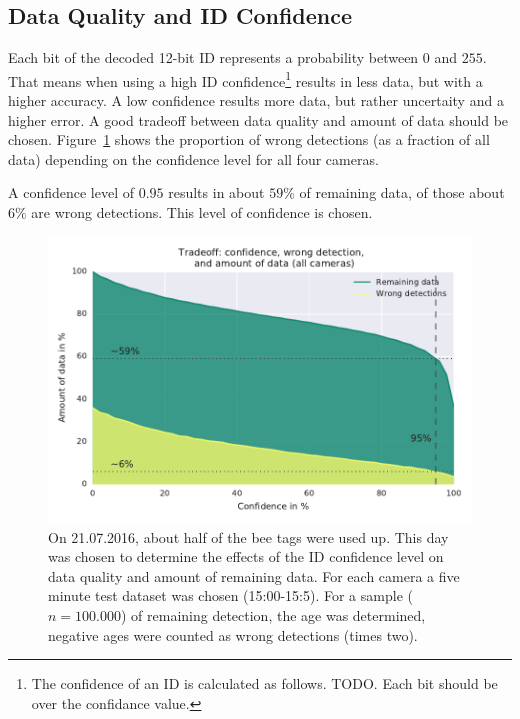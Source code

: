 \subsection{Data Quality and ID Confidence}
\label{subsec:confidence}

Each bit of the decoded 12-bit ID represents a probability between $0$ and $255$. That means when using a high ID confidence\footnote{The confidence of an ID is calculated as follows. TODO. Each bit should be over the confidance value.} results in less data, but with a higher accuracy.
A low confidence results more data, but rather uncertaity and a higher error. A good tradeoff between data quality and amount of data should be chosen. Figure~\ref{fig:tradeoff} shows the proportion of wrong detections (as a fraction of all data) depending on the confidence level for all four cameras.

A confidence level of $0.95$ results in about $59\%$ of remaining data, of those about $6\%$ are wrong detections. This level of confidence is chosen.

\begin{figure}[htb]
	\centering
	\includegraphics[width=1.0\textwidth]{Figures/tradeoff}
	\caption[Tradeoff: Confidence level, data quality and amount of data]{On 21.07.2016, about half of the bee tags were used up. This day was chosen to determine the effects of the ID confidence level on data quality and amount of remaining data. For each camera a five minute test dataset was chosen (15:00-15:5). For a sample ($n= 100.000$) of remaining detection, the age was determined, negative ages were counted as wrong detections (times two).}
	\label{fig:tradeoff}
\end{figure}

